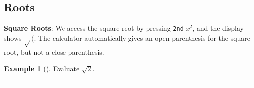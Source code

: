 \documentclass[10pt,]{book}
\newcommand{\terminology}[1]{\textbf{#1}}
\theoremstyle{plain}
\theoremstyle{definition}
\theoremstyle{definition}
\newtheorem{example}[theorem]{Example}
\theoremstyle{definition}
\numberwithin{equation}{part}
\newlength{\panelmax}
\begin{document}
\subsection[{Roots}]{Roots}\label{subsection-69}
\terminology{Square Roots}: We access the square root by pressing \lstinline?2nd? \(\boxed{x^2} \), and the display shows \(\sqrt{}(\). The calculator automatically gives an open parenthesis for the square root, but not a close parenthesis.%
\begin{example}[]\label{example-103}
Evaluate \(\sqrt{2} \).%
{%
\setlength{\panelmax}{0pt}
\newsavebox{\panelboxAITp}
\newlength{\phAITp}\setlength{\phAITp}{\ht\panelboxAITp+\dp\panelboxAITp}
\settototalheight{\phAITp}{\usebox{\panelboxAITp}}
\setlength{\panelmax}{\maxof{\panelmax}{\phAITp}}
\newsavebox{\panelboxAIUp}
\newlength{\phAIUp}\setlength{\phAIUp}{\ht\panelboxAIUp+\dp\panelboxAIUp}
\settototalheight{\phAIUp}{\usebox{\panelboxAIUp}}
\setlength{\panelmax}{\maxof{\panelmax}{\phAIUp}}
\leavevmode%
\setlength{\tabcolsep}{0.025\textwidth}
\begin{figure}
\begin{tabular}{@{}*{2}{c}@{}}
\begin{minipage}[c][\panelmax][t]{0.6\textwidth}\usebox{\panelboxAITp}\end{minipage}&
\begin{minipage}[c][\panelmax][t]{0.35\textwidth}\usebox{\panelboxAIUp}\end{minipage}\end{tabular}
\end{figure}
}%
\end{example}
\end{document}
